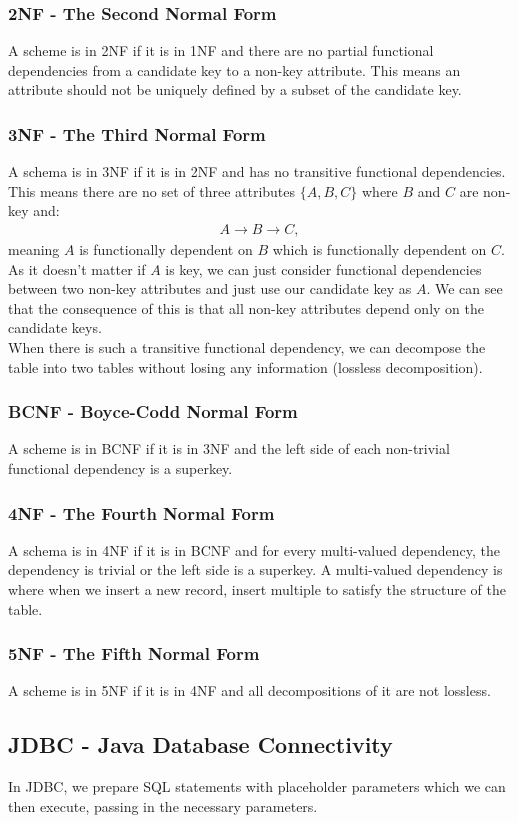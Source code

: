 \subsubsection{2NF - The Second Normal Form}

A scheme is in 2NF if it is in 1NF and there are no partial functional
dependencies from a candidate key to a non-key attribute. This means
an attribute should not be uniquely defined by a subset of the candidate key.

\subsubsection{3NF - The Third Normal Form}

A schema is in 3NF if it is in 2NF and has no transitive functional dependencies.
This means there are no set of three attributes $\{A, B, C\}$ where $B$ and $C$
are non-key and: \begin{gather*}
    A \rightarrow B \rightarrow C,
\end{gather*} meaning $A$ is functionally dependent on $B$ which is functionally 
dependent on $C$. As it doesn't matter if $A$ is key, we can just consider functional
dependencies between two non-key attributes and just use our candidate key as $A$.
We can see that the consequence of this is that all non-key attributes depend only on
the candidate keys.
\\[\baselineskip]
When there is such a transitive functional dependency, we can decompose the table
into two tables without losing any information (lossless decomposition).

\subsubsection{BCNF - Boyce-Codd Normal Form}

A scheme is in BCNF if it is in 3NF and the left side of each non-trivial
functional dependency is a superkey.

\subsubsection{4NF - The Fourth Normal Form}

A schema is in 4NF if it is in BCNF and for every multi-valued dependency, 
the dependency is trivial or the left side is a superkey. A multi-valued dependency
is where when we insert a new record, insert multiple to satisfy the structure of the
table.

\subsubsection{5NF - The Fifth Normal Form}

A scheme is in 5NF if it is in 4NF and all decompositions of it are not lossless.

\subsection{JDBC - Java Database Connectivity}

In JDBC, we prepare SQL statements with placeholder parameters which we can
then execute, passing in the necessary parameters.
